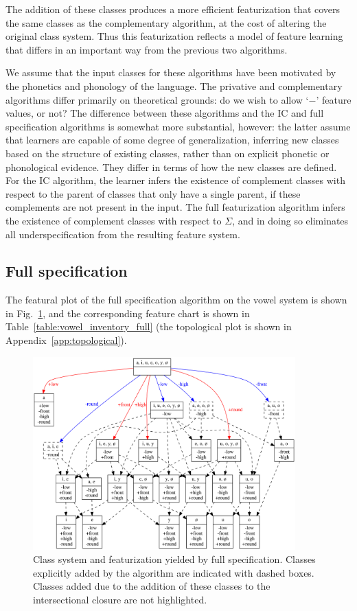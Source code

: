 \documentclass[12pt, oneside]{article}   	%
\begin{document}
The addition of these classes produces a more efficient featurization that covers the same classes as the complementary algorithm, at the cost of altering the original class system. Thus this featurization reflects a model of feature learning that differs in an important way from the previous two algorithms.

We assume that the input classes for these algorithms have been motivated by the phonetics and phonology of the language. The privative and complementary algorithms differ primarily on theoretical grounds: do we wish to allow `$-$' feature values, or not? The difference between these algorithms and the IC and full specification algorithms is somewhat more substantial, however: the latter assume that learners are capable of some degree of generalization, inferring new classes based on the structure of existing classes, rather than on explicit phonetic or phonological evidence. They differ in terms of how the new classes are defined. For the IC algorithm, the learner infers the existence of complement classes with respect to the parent of classes that only have a single parent, if these complements are not present in the input. The full featurization algorithm infers the existence of complement classes with respect to $\Sigma$, and in doing so eliminates all underspecification from the resulting feature system.

\subsection{Full specification}

The featural plot of the full specification algorithm on the vowel system is shown in Fig.~\ref{fig:vowel_inventory_full}, and the corresponding feature chart is shown in Table~\ref{table:vowel_inventory_full} (the topological plot is shown in Appendix~\ref{app:topological}).

\begin{figure}[htb!]
	\centering
	\includegraphics[width=0.9\textwidth]{vowel_inventory_full_FEATURAL.png}
	\caption{Class system and featurization yielded by full specification.  Classes explicitly added by the algorithm are indicated with dashed boxes. Classes added due to the addition of these classes to the intersectional closure are not highlighted.}
	\label{fig:vowel_inventory_full}
\end{figure}
\end{document}
